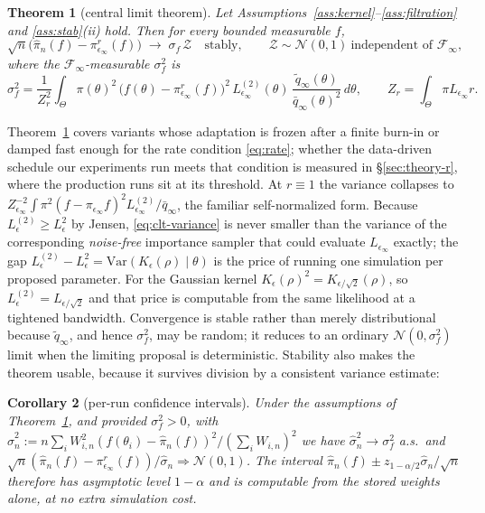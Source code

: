 \documentclass[10pt]{article}
\theoremstyle{plain}
\newtheorem{theorem}{Theorem}
\newtheorem{corollary}[theorem]{Corollary}
\theoremstyle{definition}
\begin{document}
\begin{theorem}[central limit theorem]\label{thm:clt}
Let Assumptions~\ref{ass:kernel}--\ref{ass:filtration} and \ref{ass:stab}(ii) hold. Then for every bounded measurable $f$,
\begin{equation}
\sqrt{n}\bigl(\widehat\pi_n(f)-\pi^r_{\epsilon_\infty}(f)\bigr)\;\longrightarrow\;\sigma_f\,\mathcal{Z}
\quad\text{stably},\qquad \mathcal{Z}\sim\mathcal{N}(0,1)\ \text{independent of }\mathcal{F}_\infty,
\label{eq:clt-conv}
\end{equation}
where the $\mathcal{F}_\infty$-measurable $\sigma^2_f$ is
\begin{equation}
\sigma_f^2=\frac{1}{Z_r^{2}}\int_\Theta \pi(\theta)^2\,\bigl(f(\theta)-\pi^r_{\epsilon_\infty}(f)\bigr)^2\,L^{(2)}_{\epsilon_\infty}(\theta)\,\frac{\tilde q_\infty(\theta)}{\bar q_\infty(\theta)^2}\,d\theta,
\qquad Z_r=\int_\Theta\pi L_{\epsilon_\infty}r .
\label{eq:clt-variance}
\end{equation}
\end{theorem}

Theorem~\ref{thm:clt} covers variants whose adaptation is frozen after a finite burn-in or damped fast enough for the rate condition \eqref{eq:rate}; whether the data-driven schedule our experiments run meets that condition is measured in \S\ref{sec:theory-r}, where the production runs sit at its threshold. At $r\equiv1$ the variance collapses to $Z_{\epsilon_\infty}^{-2}\int\pi^2(f-\pi_{\epsilon_\infty}f)^2L^{(2)}_{\epsilon_\infty}/\bar q_\infty$, the familiar self-normalized form. Because $L^{(2)}_\epsilon\ge L^2_\epsilon$ by Jensen, \eqref{eq:clt-variance} is never smaller than the variance of the corresponding \emph{noise-free} importance sampler that could evaluate $L_{\epsilon_\infty}$ exactly; the gap $L^{(2)}_\epsilon-L^2_\epsilon=\mathrm{Var}(K_\epsilon(\rho)\mid\theta)$ is the price of running one simulation per proposed parameter. For the Gaussian kernel $K_\epsilon(\rho)^2=K_{\epsilon/\sqrt2}(\rho)$, so $L^{(2)}_\epsilon=L_{\epsilon/\sqrt2}$ and that price is computable from the same likelihood at a tightened bandwidth. Convergence is stable rather than merely distributional because $\tilde q_\infty$, and hence $\sigma^2_f$, may be random; it reduces to an ordinary $\mathcal{N}(0,\sigma^2_f)$ limit when the limiting proposal is deterministic. Stability also makes the theorem usable, because it survives division by a consistent variance estimate:

\begin{corollary}[per-run confidence intervals]\label{cor:ci}
Under the assumptions of Theorem~\ref{thm:clt}, and provided $\sigma^2_f>0$, with
$\widehat\sigma_n^2 := n\sum_i W_{i,n}^2(f(\theta_i)-\widehat\pi_n(f))^2 / (\sum_i W_{i,n})^2$
we have $\widehat\sigma^2_n\to\sigma^2_f$ a.s.\ and $\sqrt n(\widehat\pi_n(f)-\pi^r_{\epsilon_\infty}(f))/\widehat\sigma_n\Rightarrow\mathcal{N}(0,1)$. The interval $\widehat\pi_n(f)\pm z_{1-\alpha/2}\widehat\sigma_n/\sqrt n$ therefore has asymptotic level $1-\alpha$ and is computable from the stored weights alone, at no extra simulation cost.
\end{corollary}
\end{document}
